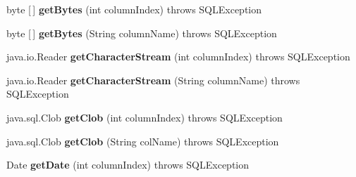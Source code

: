 \begin{DoxyCompactItemize}
\mbox{\label{classcom_1_1mysql_1_1cj_1_1jdbc_1_1result_1_1_result_set_impl_a2ef6004e11b94cedd1931f45d1943705}} 
byte \mbox{[}$\,$\mbox{]} {\bfseries get\+Bytes} (int column\+Index)  throws S\+Q\+L\+Exception 
\item 
\mbox{\label{classcom_1_1mysql_1_1cj_1_1jdbc_1_1result_1_1_result_set_impl_a2d50a785cfd099214bdf90ec5090d864}} 
byte \mbox{[}$\,$\mbox{]} {\bfseries get\+Bytes} (String column\+Name)  throws S\+Q\+L\+Exception 
\item 
\mbox{\label{classcom_1_1mysql_1_1cj_1_1jdbc_1_1result_1_1_result_set_impl_a77ab823ed66ea7e92f016344e1aee7b7}} 
java.\+io.\+Reader {\bfseries get\+Character\+Stream} (int column\+Index)  throws S\+Q\+L\+Exception 
\item 
\mbox{\label{classcom_1_1mysql_1_1cj_1_1jdbc_1_1result_1_1_result_set_impl_a86147d71382fd6090a1e830436849670}} 
java.\+io.\+Reader {\bfseries get\+Character\+Stream} (String column\+Name)  throws S\+Q\+L\+Exception 
\item 
\mbox{\label{classcom_1_1mysql_1_1cj_1_1jdbc_1_1result_1_1_result_set_impl_a112a8c3b13c1c93a7e4250a8c5d28c80}} 
java.\+sql.\+Clob {\bfseries get\+Clob} (int column\+Index)  throws S\+Q\+L\+Exception 
\item 
\mbox{\label{classcom_1_1mysql_1_1cj_1_1jdbc_1_1result_1_1_result_set_impl_ac65c4395ad98c2b6a46d2fa2da01e7a3}} 
java.\+sql.\+Clob {\bfseries get\+Clob} (String col\+Name)  throws S\+Q\+L\+Exception 
\item 
\mbox{\label{classcom_1_1mysql_1_1cj_1_1jdbc_1_1result_1_1_result_set_impl_ae39664e465671fa88e85e51e7d357f53}} 
Date {\bfseries get\+Date} (int column\+Index)  throws S\+Q\+L\+Exception 
\item 
\mbox{\label{classcom_1_1mysql_1_1cj_1_1jdbc_1_1result_1_1_result_set_impl_a3ffda85e2b98127bd0a82c3e77be7d7f}} 

\end{DoxyCompactItemize}
